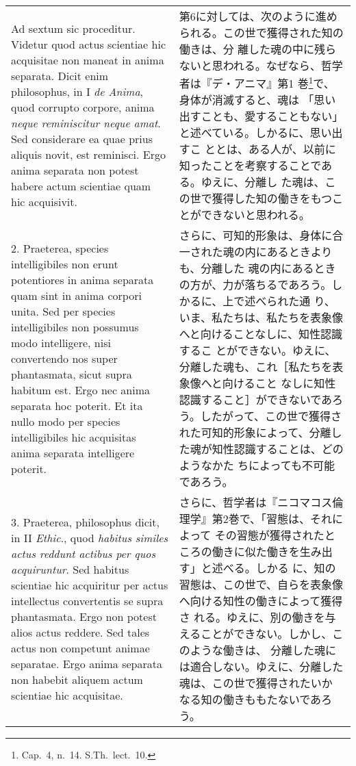 \documentclass[10pt]{jsarticle} %
\begin{document}
\begin{longtable}{p{21em}p{21em}}

{\huge A}{\sc d sextum sic proceditur}. Videtur quod actus scientiae
hic acquisitae non maneat in anima separata. Dicit enim philosophus,
in I {\it de Anima}, quod corrupto corpore, anima {\it neque
reminiscitur neque amat}. Sed considerare ea quae prius aliquis novit,
est reminisci. Ergo anima separata non potest habere actum scientiae
quam hic acquisivit.

&

第6に対しては、次のように進められる。この世で獲得された知の働きは、分
離した魂の中に残らないと思われる。なぜなら、哲学者は『デ・アニマ』第1
巻\footnote{Cap.~4, n.~14. S.Th.~lect.~10.}で、身体が消滅すると、魂は
「思い出すことも、愛することもない」と述べている。しかるに、思い出すこ
ととは、ある人が、以前に知ったことを考察することである。ゆえに、分離し
た魂は、この世で獲得した知の働きをもつことができないと思われる。

\\

2. {\sc Praeterea}, species intelligibiles non erunt potentiores in
anima separata quam sint in anima corpori unita. Sed per species
intelligibiles non possumus modo intelligere, nisi convertendo nos
super phantasmata, sicut supra habitum est. Ergo nec anima separata
hoc poterit. Et ita nullo modo per species intelligibiles hic
acquisitas anima separata intelligere poterit.

&

さらに、可知的形象は、身体に合一された魂の内にあるときよりも、分離した
魂の内にあるときの方が、力が落ちるであろう。しかるに、上で述べられた通
り、いま、私たちは、私たちを表象像へと向けることなしに、知性認識するこ
とができない。ゆえに、分離した魂も、これ［私たちを表象像へと向けること
なしに知性認識すること］ができないであろう。したがって、この世で獲得さ
れた可知的形象によって、分離した魂が知性認識することは、どのようなかた
ちによっても不可能であろう。

\\

3. {\sc Praeterea}, philosophus dicit, in II {\it Ethic}., quod {\it
habitus similes actus reddunt actibus per quos acquiruntur}. Sed
habitus scientiae hic acquiritur per actus intellectus convertentis se
supra phantasmata. Ergo non potest alios actus reddere. Sed tales
actus non competunt animae separatae. Ergo anima separata non habebit
aliquem actum scientiae hic acquisitae.

& さらに、哲学者は『ニコマコス倫理学』第2巻で、「習態は、それによって
その習態が獲得されたところの働きに似た働きを生み出す」と述べる。しかる
に、知の習態は、この世で、自らを表象像へ向ける知性の働きによって獲得さ
れる。ゆえに、別の働きを与えることができない。しかし、このような働きは、
分離した魂には適合しない。ゆえに、分離した魂は、この世で獲得されたいか
なる知の働きももたないであろう。




\end{longtable}
\end{document}
